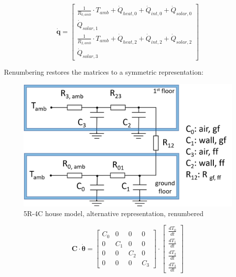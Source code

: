 \begin{equation}
	\mathbf{\dot{q}} =
	\begin{bmatrix}
		\frac{1}{R_{0, amb}} \cdot T_{amb} + \dot{Q}_{heat, 0} + \dot{Q}_{int, 0} + \dot{Q}_{solar, 0} \\
		\dot{Q}_{solar, 1} \\
		\frac{1}{R_{2, amb}} \cdot T_{amb} + \dot{Q}_{heat, 2} + \dot{Q}_{int, 2} + \dot{Q}_{solar, 2} \\
		\dot{Q}_{solar, 3} 
	\end{bmatrix}
\end{equation}

Renumbering restores the matrices to a symmetric representation:

\begin{figure}[H]
	\centering
	\includegraphics[width=0.6\columnwidth]{Pictures/5R4C_renumbered.png}
	\caption[Short title]{5R-4C house model, alternative representation, renumbered}
	\label{fig:renum5R4C}
\end{figure}

\begin{equation}
	\mathbf{C} \cdot \boldsymbol{\dot{\theta}} =
	\begin{bmatrix}
		C_{0} & 0 & 0 & 0\\
		0 &  C_{1} & 0 & 0 \\
		0 & 0 & C_{2} & 0\\
		0 & 0 & 0 & C_{3}
	\end{bmatrix}
	\cdot
	\begin{bmatrix}
		\frac{dT_{0}}{dt} \\
		\frac{dT_{1}}{dt} \\
		\frac{dT_{2}}{dt} \\
		\frac{dT_{3}}{dt} 
	\end{bmatrix}
\end{equation}

